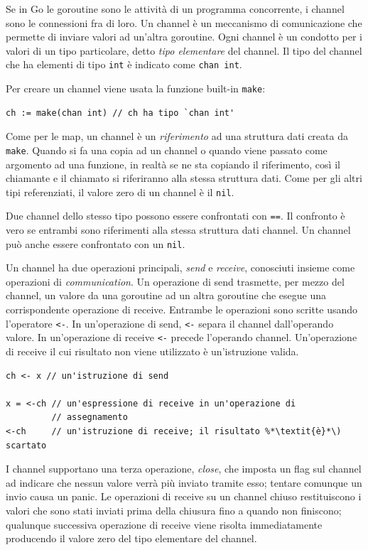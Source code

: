 %
Se in Go le goroutine sono le attività di un programma concorrente, i channel sono le connessioni fra di loro.
Un channel è un meccanismo di comunicazione che permette di inviare valori ad un'altra goroutine.
Ogni channel è un condotto per i valori di un tipo particolare, detto \textit{tipo elementare} del channel.
Il tipo del channel che ha elementi di tipo \verb|int| è indicato come \verb|chan int|.

Per creare un channel viene usata la funzione built-in \verb|make|:
\begin{lstlisting}[frame=single, label={lst:lstlisting7-4.1}]
ch := make(chan int) // ch ha tipo `chan int'
\end{lstlisting}
Come per le map, un channel è un \textit{riferimento} ad una struttura dati creata da \verb|make|.
Quando si fa una copia ad un channel o quando viene passato come argomento ad una funzione, in realtà se ne sta copiando il riferimento, così il chiamante e il chiamato si riferiranno alla stessa struttura dati.
Come per gli altri tipi referenziati, il valore zero di un channel è il \verb|nil|.

Due channel dello stesso tipo possono essere confrontati con \verb|==|.
Il confronto è vero se entrambi sono riferimenti alla stessa struttura dati channel.
Un channel può anche essere confrontato con un \verb|nil|.

Un channel ha due operazioni principali, \textit{send} e \textit{receive}, conosciuti insieme come operazioni di \textit{communication}.
Un operazione di send trasmette, per mezzo del channel, un valore da una goroutine ad un altra goroutine che esegue una corrispondente operazione di receive.
Entrambe le operazioni sono scritte usando l'operatore \verb|<-|.
In un'operazione di send, \verb|<-| separa il channel dall'operando valore.
In un'operazione di receive \verb|<-| precede l'operando channel.
Un'operazione di receive il cui risultato non viene utilizzato è un'istruzione valida.
\begin{lstlisting}[frame=single, label={lst:lstlisting7-4.2}]
ch <- x // un'istruzione di send

x = <-ch // un'espressione di receive in un'operazione di
         // assegnamento
<-ch     // un'istruzione di receive; il risultato %*\textit{è}*\) scartato
\end{lstlisting}
I channel supportano una terza operazione, \textit{close}, che imposta un flag sul channel ad indicare che nessun valore verrà più inviato tramite esso;
tentare comunque un invio causa un panic.
Le operazioni di receive su un channel chiuso restituiscono i valori che sono stati inviati prima della chiusura fino a quando non finiscono;
qualunque successiva operazione di receive viene risolta immediatamente producendo il valore zero del tipo elementare del channel.

